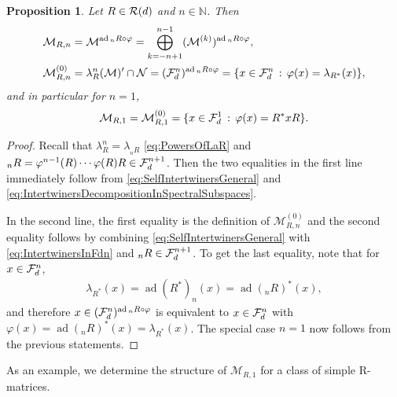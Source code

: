 \documentclass[12pt,a4paper]{amsart}
\numberwithin{equation}{section}
\newtheorem{proposition}[theorem]{Proposition}
\theoremstyle{remark}
\DeclareMathOperator{\ad}{ad}
\newcommand{\Nl}{\mathbb{N}}
\newcommand{\la}{\lambda}
\newcommand{\CM}[0]{\mathcal{M}} \newcommand{\CN}[0]{\mathcal{N}}
\begin{document}
\begin{proposition}\label{proposition:MRn}
 Let $R\in\mathcal{R}(d)$ and $n\in\Nl$. Then 
 \begin{align}
  \CM_{R,n}
  &=
  \CM^{\ad {}_nR\circ\varphi}
  =
  \bigoplus_{k=-n+1}^{n-1}
  (\CM^{(k)})^{\ad {}_nR\circ\varphi},
  \\
  \CM_{R,n}^{(0)}
  &=
  \la_R^n(\CM)'\cap\CN
  =
  (\CF_d^n)^{\ad{}_nR\circ\varphi}
  =
  \{x\in\CF_d^n\,:\,\varphi(x)=\la_{R^*}(x)\},
 \end{align}
 and in particular for $n=1$,
 \begin{align}\label{eq:MR1}
 \CM_{R,1}
 =
 \CM_{R,1}^{(0)}
 =
 \{x\in\CF_d^1\,:\,\varphi(x)=R^*xR\}.
\end{align}
\end{proposition}
\begin{proof}
 Recall that $\la_R^n=\la_{{}_nR}$ \eqref{eq:PowersOfLaR} and ${}_nR=\varphi^{n-1}(R)\cdots\varphi(R)R\in\mathcal{F}_d^{n+1}$. Then the two equalities in the first line immediately follow from \eqref{eq:SelfIntertwinersGeneral} and \eqref{eq:IntertwinersDecompositionInSpectralSubspaces}.
 
 In the second line, the first equality is the definition of $\CM_{R,n}^{(0)}$ and the second equality follows by combining \eqref{eq:SelfIntertwinersGeneral} with \eqref{eq:IntertwinersInFdn} and ${}_nR\in\mathcal{F}_d^{n+1}$. To get the last equality, note that for $x\in\mathcal{F}_d^n$, 
 \begin{align*}
  \la_{R^*}(x)
  =\ad (R^*)_n (x)
  =\ad ({}_nR)^* (x),
 \end{align*}
and therefore $x\in(\CF_d^n)^{\ad{}_nR\circ\varphi}$ is equivalent to $x\in\mathcal{F}_d^n$ with $\varphi(x)=\ad({}_nR)^*(x)=\la_{R^*}(x)$. The special case $n=1$ now follows from the previous statements.
\end{proof}

As an example, we determine the structure of $\CM_{R,1}$ for a class of simple R-matrices.
\end{document}
